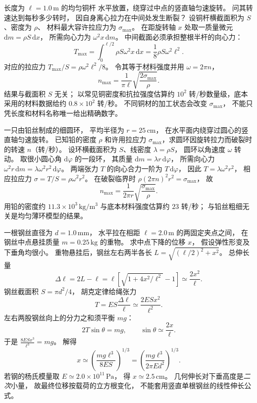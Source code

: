 长度为 $\ell=1.0\,\mathrm m$ 的均匀铜杆
水平放置，绕穿过中点的竖直轴匀速旋转。
问其转速达到每秒多少转时，
因自身离心拉力在中间处发生断裂？
\exsolution
设铜杆横截面积为 $S$、密度为 $\rho$、
材料最大容许拉应力为 $\sigma_{\max}$。
在距旋转轴 $x$ 处取一质量微元
$\mathrm dm=\rho S\,\mathrm dx$，
所需向心力为
$\omega^2x\,\mathrm dm$。
中间截面必须承担整根半杆的向心力：
\[
T_{\max}=\int_0^{\ell/2}
\rho S\omega^2x\,\mathrm dx
=\frac18\rho S\omega^2\ell^2.
\]
对应的拉应力
$T_{\max}/S=\rho\omega^2\ell^2/8$。
令其等于材料强度并用
$\omega=2\pi n$，
\[
\boxed{n_{\max}=
\frac1{\pi\ell}\sqrt{\frac{2\sigma_{\max}}{\rho}}}.
\]
\excheck 结果与截面积 $S$ 无关；
以常见铜密度和抗拉强度估算约
$10^2$ 转/秒数量级，底本采用的材料数据给约
$0.8\times10^2$ 转/秒。
不同铜材的加工状态会改变 $\sigma_{\max}$，
不能只凭长度和材料名称唯一给出精确数字。

一只由铅丝制成的细圆环，
平均半径为 $r=25\,\mathrm{cm}$，
在水平面内绕穿过圆心的竖直轴匀速旋转。
已知铅的密度 $\rho$ 和许用拉应力
$\sigma_{\max}$，求圆环因旋转拉力而破裂时的转速
$n$（转/秒）。
\exsolution
设环横截面积为 $S$、线密度
$\lambda=\rho S$，
圆环以角速度 $\omega$ 转动。
取很小圆心角 $\mathrm d\varphi$ 的一段环，
其质量
$\mathrm dm=\lambda r\,\mathrm d\varphi$，
所需向心力
$\omega^2 r\,\mathrm dm=
\lambda\omega^2r^2\,\mathrm d\varphi$。
两端张力 $T$ 的向心合力一阶为
$T\,\mathrm d\varphi$，
因此 $T=\lambda\omega^2r^2$，
相应拉应力
$\sigma=T/S=\rho\omega^2r^2$。
在破裂临界时
$\rho(2\pi n)^2r^2=\sigma_{\max}$，
故
\[
\boxed{n_{\max}=\frac1{2\pi r}
\sqrt{\frac{\sigma_{\max}}{\rho}}}.
\]
\excheck 用铅的密度约
$11.3\times10^3\,\mathrm{kg/m^3}$
与底本材料强度估算约 $23$ 转/秒；
与铅丝粗细无关是均匀薄环模型的结果。

一根钢丝直径为 $d=1.0\,\mathrm{mm}$，
水平拉在相距 $\ell=2.0\,\mathrm m$ 的两固定夹点之间，
在钢丝中点悬挂质量 $m=0.25\,\mathrm{kg}$ 的重物。
求中点下降的位移 $x$，
假设弹性形变及下垂角均很小。
\exsolution
重物悬挂后，钢丝左右两半各长
$L=\sqrt{(\ell/2)^2+x^2}$。
总伸长量
\[
\Delta\ell=2L-\ell
=\ell\left[\sqrt{1+4x^2/\ell^2}-1\right]
\simeq\frac{2x^2}{\ell}.
\]
钢丝截面积 $S=\pi d^2/4$，
胡克定律给绳张力
\[
T=ES\frac{\Delta\ell}{\ell}
\simeq\frac{2ESx^2}{\ell^2}.
\]
左右两股钢丝向上的分力之和须平衡 $mg$：
\[
2T\sin\theta=mg,\qquad
\sin\theta\simeq\frac{2x}{\ell}.
\]
于是
$\frac{8ESx^3}{\ell^3}=mg$。
解得
\[
\boxed{x\simeq
\left(\frac{mg\ell^3}{8ES}\right)^{1/3}
=\left(\frac{mg\ell^3}{2\pi E d^2}\right)^{1/3}}.
\]
若钢的杨氏模量取
$E\simeq2.0\times10^{11}\,\mathrm{Pa}$，
得 $\boxed{x\simeq2.5\,\mathrm{cm}}$。
\excheck 几何伸长对下垂高度是\emph{二次}小量，
故最终位移按载荷的立方根变化，
不能套用竖直单根钢丝的线性伸长公式。

